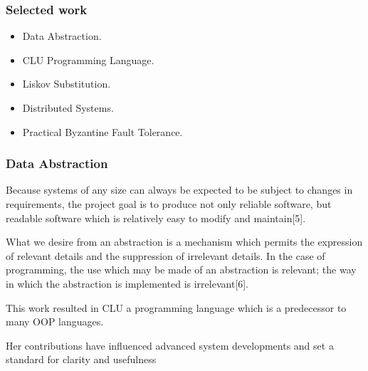 \documentclass{beamer}
\begin{document}

\begin{frame}
\frametitle{Selected work}
\begin{itemize}
\item Data Abstraction.
\item CLU Programming Language.
\item Liskov Substitution.
\item Distributed Systems.
\item Practical Byzantine Fault Tolerance.
\end{itemize}
\end{frame}


\begin{frame}
\frametitle{Data Abstraction}
Because  systems  of  any  size  can  always  be  expected  to  be  subject  to  changes  in  requirements,  the  project  goal  is  to  produce  not  only  reliable  software,  but  readable  software  which  is relatively  easy  to  modify  and  maintain[5].

\vspace{5mm}

What we desire from an abstraction is a mechanism which permits the expression of relevant details and the suppression of irrelevant details. In the case of programming, the use which may be made of an abstraction is relevant; the way in which the abstraction is implemented is irrelevant[6]. 

\vspace{5mm}

This work resulted in CLU a programming language which is a predecessor to many OOP languages.

\vspace{5mm}

Her contributions have influenced advanced system developments and set a standard for clarity and usefulness

\end{frame}
\end{document}
